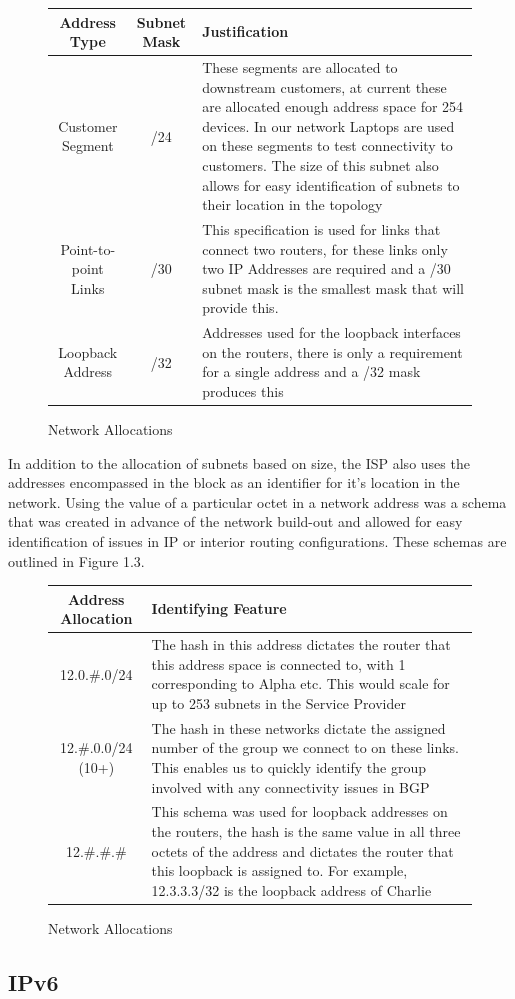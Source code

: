 \begin{figure}[h!]
	\caption{Network Allocations}
	\centering
	\begin{tabular}{|c|c|p{5.5cm}|}
		\hline \textbf{Address Type} & \textbf{Subnet Mask} & \textbf{Justification} \\ 
		\hline Customer Segment & /24 & These segments are allocated to downstream customers, at current these are allocated enough address space for 254 devices. In our network Laptops are used on these segments to test connectivity to customers. The size of this subnet also allows for easy identification of subnets to their location in the topology  \\ 
		\hline Point-to-point Links & /30 & This specification is used for links that connect two routers, for these links only two IP Addresses are required and a /30 subnet mask is the smallest mask that will provide this. \\ 
		\hline Loopback Address & /32 & Addresses used for the loopback interfaces on the routers, there is only a requirement for a single address and a /32 mask produces this \\ 
		\hline 
	\end{tabular} 
\end{figure}


In addition to the allocation of subnets based on size, the ISP also uses the addresses encompassed in the block as an identifier for it's location in the network. Using the value of a particular octet in a network address was a schema that was created in advance of the network build-out and allowed for easy identification of issues in IP or interior routing configurations. These schemas are outlined in Figure 1.3.
\FloatBarrier
\begin{figure}[h!]
	\caption{Network Allocations}
	\centering
	\begin{tabular}{|c|p{8cm}|}
		\hline \textbf{Address Allocation} & \textbf{Identifying Feature} \\ 
		\hline 12.0.\#.0/24 & The hash in this address dictates the router that this address space is connected to, with 1 corresponding to Alpha etc. This would scale for up to 253 subnets in the Service Provider \\ 
		\hline 12.\#.0.0/24 (10+) & The hash in these networks dictate the assigned number of the group we connect to on these links. This enables us to quickly identify the group involved with any connectivity issues in BGP  \\ 
		\hline 12.\#.\#.\# & This schema was used for loopback addresses on the routers, the hash is the same value in all three octets of the address and dictates the router that this loopback is assigned to. For example, 12.3.3.3/32 is the loopback address of Charlie \\ 
		\hline 
	\end{tabular} 
\end{figure}
\FloatBarrier

\subsection{IPv6}